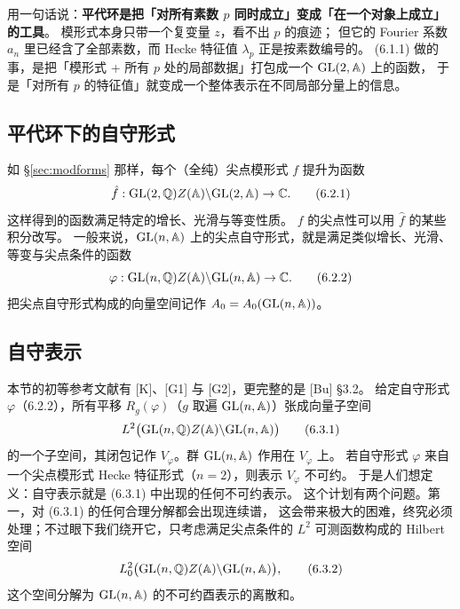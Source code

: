 \begin{yizhu}[平代环为什么能把所有素数一次收进来]
用一句话说：\textbf{平代环是把「对所有素数 $p$ 同时成立」变成「在一个对象上成立」的工具}。
模形式本身只带一个复变量 $z$，看不出 $p$ 的痕迹；
但它的 Fourier 系数 $a_n$ 里已经含了全部素数，而 Hecke 特征值 $\lambda_p$ 正是按素数编号的。
(6.1.1) 做的事，是把「模形式 + 所有 $p$ 处的局部数据」打包成一个 $\mathrm{GL}(2,\mathbb{A})$ 上的函数，
于是「对所有 $p$ 的特征值」就变成一个整体表示在不同局部分量上的信息。
\end{yizhu}

\subsection{平代环下的自守形式}

如 \S\ref{sec:modforms} 那样，每个（全纯）尖点模形式 $f$ 提升为函数
\begin{equation*}
\hat f:\mathrm{GL}(2,\mathbb{Q})Z(\mathbb{A})\backslash\mathrm{GL}(2,\mathbb{A})\to\mathbb{C} .
\tag{6.2.1}
\end{equation*}
这样得到的函数满足特定的增长、光滑与等变性质。
$f$ 的尖点性可以用 $\hat f$ 的某些积分改写。
一般来说，$\mathrm{GL}(n,\mathbb{A})$ 上的尖点自守形式，就是满足类似增长、光滑、等变与尖点条件的函数
\begin{equation*}
\varphi:\mathrm{GL}(n,\mathbb{Q})Z(\mathbb{A})\backslash\mathrm{GL}(n,\mathbb{A})\to\mathbb{C} .
\tag{6.2.2}
\end{equation*}
把尖点自守形式构成的向量空间记作 $A_0=A_0(\mathrm{GL}(n,\mathbb{A}))$。

\subsection{自守表示}

本节的初等参考文献有 [K]、[G1] 与 [G2]，更完整的是 [Bu] \S3.2。
给定自守形式 $\varphi$（6.2.2），所有平移 $R_g(\varphi)$（$g$ 取遍 $\mathrm{GL}(n,\mathbb{A})$）张成向量子空间
\begin{equation*}
L^2\bigl(\mathrm{GL}(n,\mathbb{Q})Z(\mathbb{A})\backslash\mathrm{GL}(n,\mathbb{A})\bigr)
\tag{6.3.1}
\end{equation*}
的一个子空间，其闭包记作 $V_\varphi$。群 $\mathrm{GL}(n,\mathbb{A})$ 作用在 $V_\varphi$ 上。
若自守形式 $\varphi$ 来自一个尖点模形式 Hecke 特征形式（$n=2$），则表示 $V_\varphi$ 不可约。
于是人们想定义：自守表示就是 (6.3.1) 中出现的任何不可约表示。
这个计划有两个问题。第一，对 (6.3.1) 的任何合理分解都会出现连续谱，
这会带来极大的困难，终究必须处理；不过眼下我们绕开它，只考虑满足尖点条件的 $L^2$ 可测函数构成的 Hilbert 空间
\begin{equation*}
L^2_0\bigl(\mathrm{GL}(n,\mathbb{Q})Z(\mathbb{A})\backslash\mathrm{GL}(n,\mathbb{A})\bigr),
\tag{6.3.2}
\end{equation*}
这个空间分解为 $\mathrm{GL}(n,\mathbb{A})$ 的不可约酉表示的离散和。

